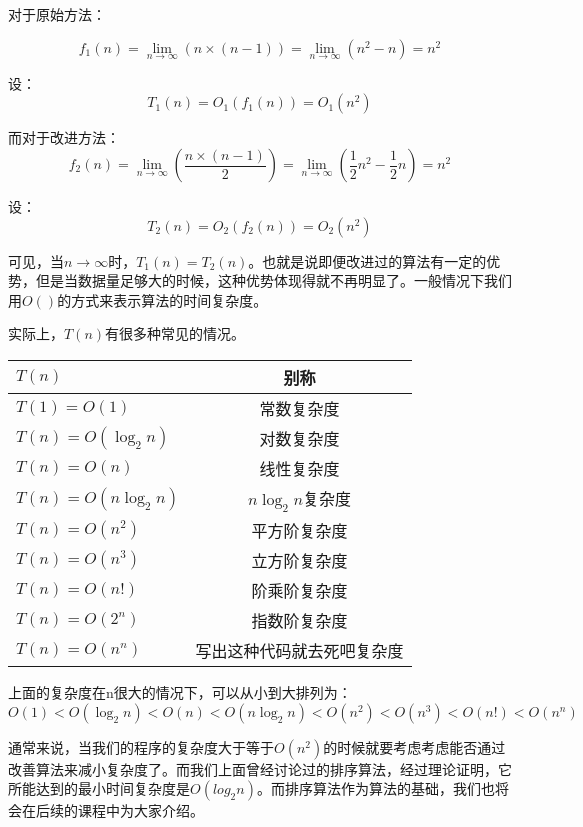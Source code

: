 对于原始方法：

\begin{equation}
f_1(n)=\lim_{n\to\infty}(n\times(n-1))=\lim_{n\to\infty}(n^2-n)=n^2
\end{equation}

设：
\begin{equation}
T_1(n)=O_1(f_1(n))=O_1(n^2)
\end{equation}

而对于改进方法：
\begin{equation}
f_2(n)=\lim_{n\to\infty}(\frac{n\times(n-1)}{2})=\lim_{n\to\infty}(\frac{1}{2}n^2-\frac{1}{2}n)=n^2
\end{equation}

设：
\begin{equation}
T_2(n)=O_2(f_2(n))=O_2(n^2)
\end{equation}

可见，当$n\to\infty$时，$T_1(n)=T_2(n)$。也就是说即便改进过的算法有一定的优势，但是当数据量足够大的时候，这种优势体现得就不再明显了。一般情况下我们用$O()$的方式来表示算法的时间复杂度。

实际上，$T(n)$有很多种常见的情况。

\begin{center}
	\begin{tabular}{|l|c|}
		\hline
			$T(n)$ & 别称 \\
		\hline
			$T(1)=O(1)$ & 常数复杂度\\
			$T(n)=O(\log_{2}n)$ & 对数复杂度\\
			$T(n)=O(n)$ & 线性复杂度\\
			$T(n)=O(n\log_{2}n)$ & $n\log_{2}n$复杂度\\
			$T(n)=O(n^2)$ & 平方阶复杂度\\
			$T(n)=O(n^3)$ & 立方阶复杂度\\
			$T(n)=O(n!)$ & 阶乘阶复杂度\\
			$T(n)=O(2^n)$ & 指数阶复杂度\\
			$T(n)=O(n^n)$ & 写出这种代码就去死吧复杂度\\
		\hline
	\end{tabular}
\end{center}

上面的复杂度在n很大的情况下，可以从小到大排列为：$O(1)<O(\log_{2}n)<O(n)<O(n\log_{2}n)<O(n^2)<O(n^3)<O(n!)<O(n^n)$

通常来说，当我们的程序的复杂度大于等于$O(n^2)$的时候就要考虑考虑能否通过改善算法来减小复杂度了。而我们上面曾经讨论过的排序算法，经过理论证明，它所能达到的最小时间复杂度是$O(log_2⁡n)$。而排序算法作为算法的基础，我们也将会在后续的课程中为大家介绍。

